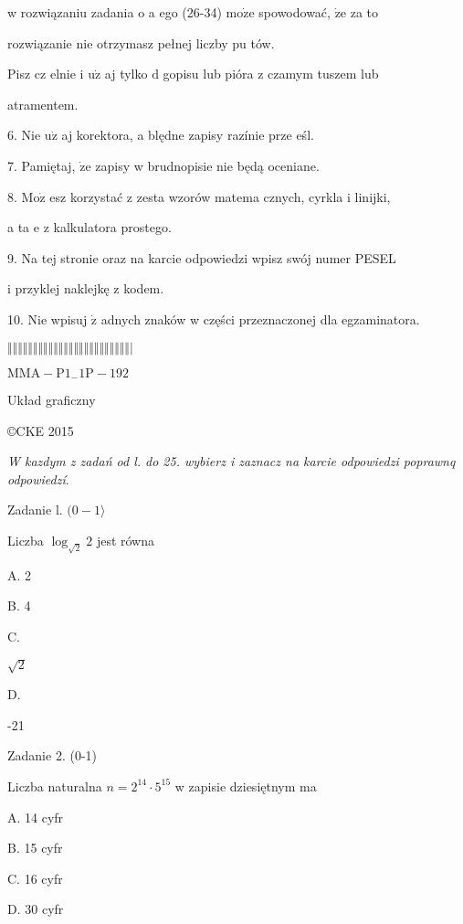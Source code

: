 \documentclass[a4paper,12pt]{article}
\begin{document}
w rozwiązaniu zadania o a ego (26-34) $\mathrm{m}\mathrm{o}\dot{\mathrm{z}}\mathrm{e}$ spowodować, $\dot{\mathrm{z}}\mathrm{e}$ za to

rozwiązanie nie otrzymasz pełnej liczby pu tów.

Pisz cz elnie i $\mathrm{u}\dot{\mathrm{z}}$ aj tylko $\mathrm{d}$ gopisu lub pióra z czamym tuszem lub

atramentem.

6. Nie $\mathrm{u}\dot{\mathrm{z}}$ aj korektora, a blędne zapisy razínie prze eśl.

7. Pamiętaj, $\dot{\mathrm{z}}\mathrm{e}$ zapisy w brudnopisie nie będą oceniane.

8. $\mathrm{M}\mathrm{o}\dot{\mathrm{z}}$ esz korzystać z zesta wzorów matema cznych, cyrkla i linijki,

a ta $\mathrm{e}$ z kalkulatora prostego.

9. Na tej stronie oraz na karcie odpowiedzi wpisz swój numer PESEL

i przyklej naklejkę z kodem.

10. Nie wpisuj $\dot{\mathrm{z}}$ adnych znaków w części przeznaczonej dla egzaminatora.

$\Vert\Vert\Vert\Vert\Vert\Vert\Vert\Vert\Vert\Vert\Vert\Vert\Vert\Vert\Vert\Vert\Vert\Vert\Vert\Vert\Vert\Vert\Vert\Vert|$

$\mathrm{M}\mathrm{M}\mathrm{A}-\mathrm{P}1_{-}1\mathrm{P}-192$

Układ graficzny

\copyright CKE 2015




{\it W kazdym z zadań od l. do 25. wybierz i zaznacz na karcie odpowiedzi poprawnq odpowiedzí}.

Zadanie l. $(0-1\rangle$

Liczba $\log_{\sqrt{2}}2$ jest równa

A. 2

B. 4

C.

$\sqrt{2}$

D.

-21

Zadanie 2. (0-1)

Liczba naturalna $n=2^{14}\cdot 5^{15}$ w zapisie dziesiętnym ma

A. 14 cyfr

B. 15 cyfr

C. 16 cyfr

D. 30 cyfr
\end{document}
